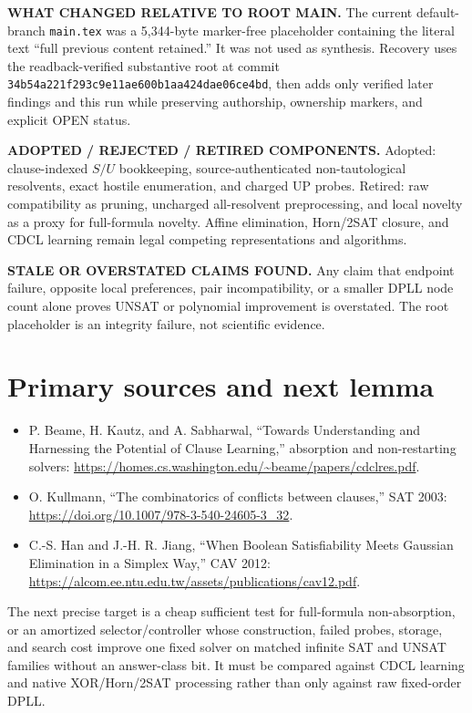 \documentclass[11pt]{article}
\begin{document}
\textbf{WHAT CHANGED RELATIVE TO ROOT MAIN.}  The current default-branch \texttt{main.tex} was a 5,344-byte marker-free placeholder containing the literal text ``full previous content retained.''  It was not used as synthesis.  Recovery uses the readback-verified substantive root at commit \texttt{34b54a221f293c9e11ae600b1aa424dae06ce4bd}, then adds only verified later findings and this run while preserving authorship, ownership markers, and explicit OPEN status.

\textbf{ADOPTED / REJECTED / RETIRED COMPONENTS.}  Adopted: clause-indexed $S/U$ bookkeeping, source-authenticated non-tautological resolvents, exact hostile enumeration, and charged UP probes.  Retired: raw compatibility as pruning, uncharged all-resolvent preprocessing, and local novelty as a proxy for full-formula novelty.  Affine elimination, Horn/2SAT closure, and CDCL learning remain legal competing representations and algorithms.

\textbf{STALE OR OVERSTATED CLAIMS FOUND.}  Any claim that endpoint failure, opposite local preferences, pair incompatibility, or a smaller DPLL node count alone proves UNSAT or polynomial improvement is overstated.  The root placeholder is an integrity failure, not scientific evidence.

\section{Primary sources and next lemma}
\begin{itemize}
\item P. Beame, H. Kautz, and A. Sabharwal, ``Towards Understanding and Harnessing the Potential of Clause Learning,'' absorption and non-restarting solvers: \url{https://homes.cs.washington.edu/~beame/papers/cdclres.pdf}.
\item O. Kullmann, ``The combinatorics of conflicts between clauses,'' SAT 2003: \url{https://doi.org/10.1007/978-3-540-24605-3_32}.
\item C.-S. Han and J.-H. R. Jiang, ``When Boolean Satisfiability Meets Gaussian Elimination in a Simplex Way,'' CAV 2012: \url{https://alcom.ee.ntu.edu.tw/assets/publications/cav12.pdf}.
\end{itemize}
The next precise target is a cheap sufficient test for full-formula non-absorption, or an amortized selector/controller whose construction, failed probes, storage, and search cost improve one fixed solver on matched infinite SAT and UNSAT families without an answer-class bit.  It must be compared against CDCL learning and native XOR/Horn/2SAT processing rather than only against raw fixed-order DPLL.

\end{document}
